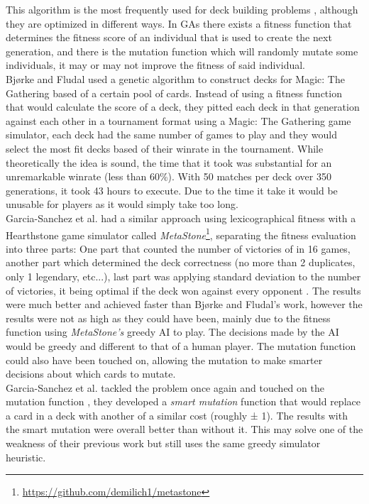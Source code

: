\documentclass{report}
\begin{document}
This algorithm is the most frequently used for deck building problems \cite{Fludal2017}\cite{GarciaSanchez2016}\cite{GarciaSanchez2018}, although they are optimized in different ways. In GAs there exists a fitness function that determines the fitness score of an individual that is used to create the next generation, and there is the mutation function which will randomly mutate some individuals, it may or may not improve the fitness of said individual. \\ 
\indent Bjørke and Fludal \cite{Fludal2017} used a genetic algorithm to construct decks for Magic: The Gathering based of a certain pool of cards. Instead of using a fitness function that would calculate the score of a deck, they pitted each deck in that generation against each other in a tournament format using a Magic: The Gathering game simulator, each deck had the same number of games to play and they would select the most fit decks based of their winrate in the tournament. While theoretically the idea is sound, the time that it took was substantial for an unremarkable winrate (less than 60\%). With 50 matches per deck over 350 generations, it took 43 hours to execute. Due to the time it take it would be unusable for players as it would simply take too long.\\
\indent Garcia-Sanchez et al. had a similar approach using lexicographical fitness with a Hearthstone game simulator called \textit{MetaStone}\footnote{\url{https://github.com/demilich1/metastone}}, separating the fitness evaluation into three parts: One part that counted the number of victories of in 16 games, another part which determined the deck correctness (no more than 2 duplicates, only 1 legendary, etc...), last part was applying standard deviation to the number of victories, it being optimal if the deck won against every opponent \cite{GarciaSanchez2016}. The results were much better and achieved faster than Bjørke and Fludal's work\cite{Fludal2017}, however the results were not as high as they could have been, mainly due to the fitness function using \textit{MetaStone's} greedy AI to play. The decisions made by the AI would be greedy and different to that of a human player. The mutation function could also have been touched on, allowing the mutation to make smarter decisions about which cards to mutate. \\
\indent Garcia-Sanchez et al. tackled the problem once again and touched on the mutation function \cite{GarciaSanchez2018}, they developed a \textit{smart mutation} function that would replace a card in a deck with another of a similar cost (roughly ± 1). The results with the smart mutation were overall better than without it. This may solve one of the weakness of their previous work\cite{GarciaSanchez2016} but still uses the same greedy simulator heuristic.
\end{document}
